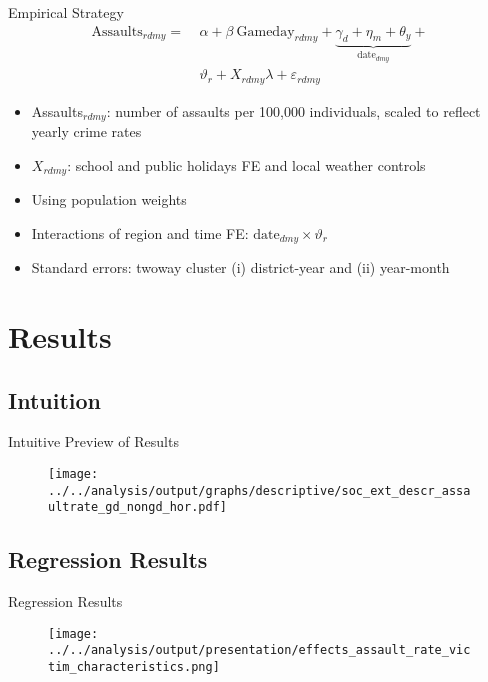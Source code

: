 \documentclass[usenames,dvipsnames]{beamer} %
\begin{document}
	\begin{frame}{Empirical Strategy}
		\begin{align}
			\text{Assaults}_{rdmy} =\ &\alpha + \beta\ \text{Gameday}_{rdmy} + \underbrace{\gamma_d +  \eta_m + \theta_y}_{\text{date}_{dmy}} + \nonumber\\ & \vartheta_r + X_{rdmy} \lambda + \varepsilon_{rdmy}
			\label{eq_soc_ext:model}
		\end{align}
	
		\begin{itemize}
			\item Assaults$_{rdmy}$: number of assaults per 100,000 individuals, scaled to reflect yearly crime rates
			\item $ X_{rdmy}$: school and public holidays FE and local weather controls
			\item Using population weights
			\item Interactions of region and time FE: $\text{date}_{dmy}\times\vartheta_r$
			\item Standard errors: twoway cluster (i) district-year and (ii) year-month
		\end{itemize}
	\end{frame}


	
\section{Results}
\subsection{Intuition}
	\begin{frame}{Intuitive Preview of Results}
		\begin{figure}
			\texttt{[image: ../../analysis/output/graphs/descriptive/soc\_ext\_descr\_assaultrate\_gd\_nongd\_hor.pdf]}
		\end{figure}
	\end{frame}



	\subsection{Regression Results}
	\begin{frame}{Regression Results}\label{link_regression_victim_characteristic}
		\begin{figure}
			\texttt{[image: ../../analysis/output/presentation/effects\_assault\_rate\_victim\_characteristics.png]}
		\end{figure}
		\hyperlink{link_regression_baseline}{} \hyperlink{link_regression_lead_lags}{} \hyperlink{link_regression_crime_characteristics}{}
	\end{frame}
\end{document}
